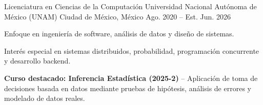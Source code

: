 \begin{cventries}

  \cventry
    {Licenciatura en Ciencias de la Computación}
    {Universidad Nacional Autónoma de México (UNAM)}
    {Ciudad de México, México}
    {Ago. 2020 -- Est. Jun. 2026}
    {
      \begin{cvitems}
        \item {Enfoque en ingeniería de software, análisis de datos y diseño de sistemas.}
        \item {Interés especial en sistemas distribuidos, probabilidad, programación concurrente y desarrollo backend.}
        \item {\textbf{Curso destacado: Inferencia Estadística (2025-2)} – Aplicación de toma de decisiones basada en datos mediante pruebas de hipótesis, análisis de errores y modelado de datos reales.}
      \end{cvitems}
    }

\end{cventries}
